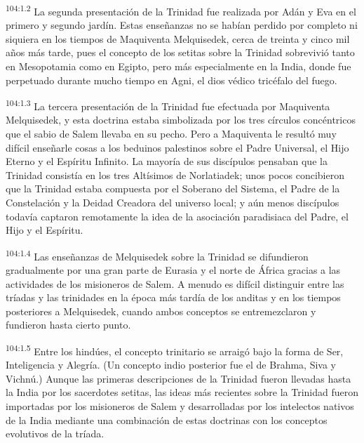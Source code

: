 \par
\textsuperscript{104:1.2} La segunda presentación de la Trinidad fue realizada por Adán y Eva en el primero y segundo jardín. Estas enseñanzas no se habían perdido por completo ni siquiera en los tiempos de Maquiventa Melquisedek, cerca de treinta y cinco mil años más tarde, pues el concepto de los setitas sobre la Trinidad sobrevivió tanto en Mesopotamia como en Egipto, pero más especialmente en la India, donde fue perpetuado durante mucho tiempo en Agni, el dios védico tricéfalo del fuego.

\par
\textsuperscript{104:1.3} La tercera presentación de la Trinidad fue efectuada por Maquiventa Melquisedek, y esta doctrina estaba simbolizada por los tres círculos concéntricos que el sabio de Salem llevaba en su pecho. Pero a Maquiventa le resultó muy difícil enseñarle cosas a los beduinos palestinos sobre el Padre Universal, el Hijo Eterno y el Espíritu Infinito. La mayoría de sus discípulos pensaban que la Trinidad consistía en los tres Altísimos de Norlatiadek; unos pocos concibieron que la Trinidad estaba compuesta por el Soberano del Sistema, el Padre de la Constelación y la Deidad Creadora del universo local; y aún menos discípulos todavía captaron remotamente la idea de la asociación paradisiaca del Padre, el Hijo y el Espíritu.

\par
\textsuperscript{104:1.4} Las enseñanzas de Melquisedek sobre la Trinidad se difundieron gradualmente por una gran parte de Eurasia y el norte de África gracias a las actividades de los misioneros de Salem. A menudo es difícil distinguir entre las tríadas y las trinidades en la época más tardía de los anditas y en los tiempos posteriores a Melquisedek, cuando ambos conceptos se entremezclaron y fundieron hasta cierto punto.

\par
\textsuperscript{104:1.5} Entre los hindúes, el concepto trinitario se arraigó bajo la forma de Ser, Inteligencia y Alegría. (Un concepto indio posterior fue el de Brahma, Siva y Vichnú.) Aunque las primeras descripciones de la Trinidad fueron llevadas hasta la India por los sacerdotes setitas, las ideas más recientes sobre la Trinidad fueron importadas por los misioneros de Salem y desarrolladas por los intelectos nativos de la India mediante una combinación de estas doctrinas con los conceptos evolutivos de la tríada.

